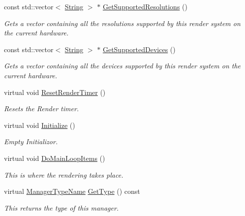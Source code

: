 \begin{DoxyCompactItemize}
const std::vector$<$ \hyperlink{namespacephys_aa03900411993de7fbfec4789bc1d392e}{String} $>$ $\ast$ \hyperlink{classphys_1_1GraphicsManager_a4bfa1c07f2c2305ec892e603a71c6341}{GetSupportedResolutions} ()
\begin{DoxyCompactList}\small\item\em Gets a vector containing all the resolutions supported by this render system on the current hardware. \item\end{DoxyCompactList}\item 
const std::vector$<$ \hyperlink{namespacephys_aa03900411993de7fbfec4789bc1d392e}{String} $>$ $\ast$ \hyperlink{classphys_1_1GraphicsManager_a7d1cce1c63d5678266337323da1e8ff5}{GetSupportedDevices} ()
\begin{DoxyCompactList}\small\item\em Gets a vector containing all the devices supported by this render system on the current hardware. \item\end{DoxyCompactList}\item 
virtual void \hyperlink{classphys_1_1GraphicsManager_ac4b864de93827447bf8f47487da3bf32}{ResetRenderTimer} ()
\begin{DoxyCompactList}\small\item\em Resets the Render timer. \item\end{DoxyCompactList}\item 
virtual void \hyperlink{classphys_1_1GraphicsManager_a554572de5d1cdce37aa1760d6e6e039c}{Initialize} ()
\begin{DoxyCompactList}\small\item\em Empty Initializor. \item\end{DoxyCompactList}\item 
virtual void \hyperlink{classphys_1_1GraphicsManager_a72e5dc563c6947cded348f19d3df41ee}{DoMainLoopItems} ()
\begin{DoxyCompactList}\small\item\em This is where the rendering takes place. \item\end{DoxyCompactList}\item 
virtual \hyperlink{classphys_1_1ManagerBase_aaa6ccddf23892eaccb898529414f80a5}{ManagerTypeName} \hyperlink{classphys_1_1GraphicsManager_abf48faad2e09cd564442e66bc0473e58}{GetType} () const 
\begin{DoxyCompactList}\small\item\em This returns the type of this manager. \item\end{DoxyCompactList}\item 

\end{DoxyCompactItemize}
